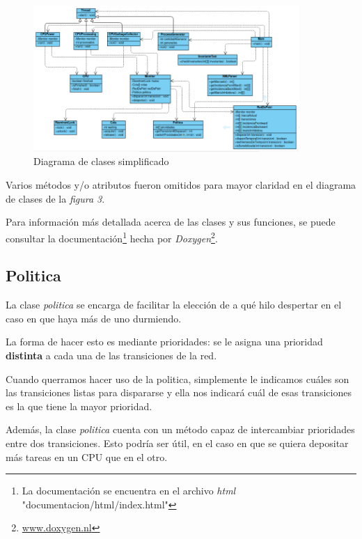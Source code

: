 \documentclass{article}
\newcommand{\fndoc}{La documentación se encuentra en el archivo \emph{html} "documentacion/html/index.html"}
\newcommand{\fndoxy}{\url{www.doxygen.nl}}
\begin{document}
    \begin{figure}[H]
        \includegraphics[width=0.9\textwidth, center]{diagrama-clases.png}
        \caption{Diagrama de clases simplificado}
    \end{figure}
    Varios métodos y/o atributos fueron omitidos para mayor claridad en el diagrama de clases
    de la \emph{figura 3}. \par   
    Para información más detallada acerca de las clases y  sus funciones, se puede consultar
    la documentación\footnote{\fndoc} hecha por \emph{Doxygen}\footnote{\fndoxy}.
    \subsection{Politica}
    La clase \emph{politica} se encarga de facilitar la elección de a qué hilo despertar en 
    el caso en que haya más de uno durmiendo. \par
    La forma de hacer esto es mediante prioridades: se le asigna una prioridad \textbf{distinta}
    a cada una de las transiciones de la red. \par
    Cuando querramos hacer uso de la politica, simplemente le indicamos cuáles son las
    transiciones listas para dispararse y ella nos indicará cuál de esas transiciones es la
    que tiene la mayor prioridad. \par
    Además, la clase \emph{politica} cuenta con un método capaz de intercambiar prioridades
    entre dos transiciones. Esto podría ser útil, en el caso en que se quiera depositar más
    tareas en un CPU que en el otro.
\end{document}
